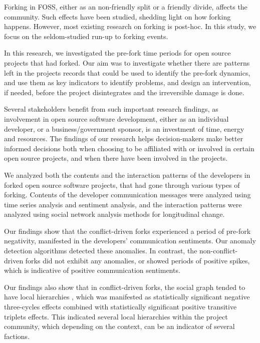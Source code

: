 \documentclass[12pt]{report}
\begin{document}
Forking in FOSS, either as an non-friendly split or a friendly divide, affects the community. Such effects have been studied, shedding light on how forking happens. However, most existing research on forking is post-hoc. In this study, we focus on the seldom-studied run-up to forking events. 

In this research, we investigated the pre-fork time periods for open source projects that had forked. Our aim was to investigate whether there are patterns left in the projects records that could be used to identify the pre-fork dynamics, and use them as key indicators to identify problems, and design an intervention, if needed, before the project disintegrates and the irreversible damage is done. 

Several stakeholders benefit from such important research findings, as involvement in open source software development, either as an individual developer, or a business/government sponsor, is an investment of time, energy and resources. The findings of our research helps decision-makers make better informed decisions both when choosing to be affiliated with or involved in certain open source projects, and when there have been involved in the projects.

We analyzed both the contents and the interaction patterns of the developers in forked open source software projects, that had gone through various types of forking. Contents of the developer communication messages were analyzed using time series analysis and sentiment analysis, and the interaction patterns were analyzed using social network analysis methods for longitudinal change. 

Our findings show that the conflict-driven forks experienced a period of pre-fork negativity, manifested in the developers' communication sentiments. Our anomaly detection algorithms detected these anomalies. In contrast, the non-conflict-driven forks did not exhibit any anomalies, or showed periods of positive spikes, which is indicative of positive communication sentiments. 

Our findings also show that in conflict-driven forks, the social graph tended to have local hierarchies \cite{Snijders2010}, which was manifested as statistically significant negative three-cycles effects combined with statistically significant positive transitive triplets effects. This indicated several local hierarchies within the project community, which depending on the context, can be an indicator of several factions.
\end{document}
